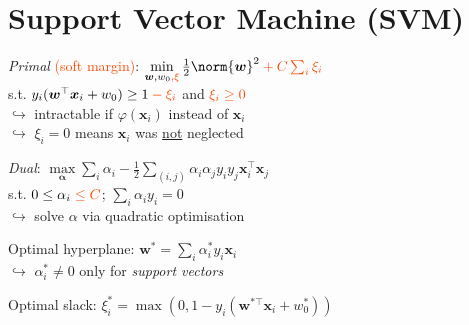 \section{Support Vector Machine (SVM)}

\textit{Primal} \textcolor{OrangeRed}{(soft margin)}: \: $\min\limits_{\bm w, w_0 \color{OrangeRed}, \xi} \frac12 \norm{\bm w}^2 \color{OrangeRed} + C\sum_i \xi_i$\\
\qquad s.t. \: $y_i(\bm w^\top \bm x_i + w_0) \geq 1 \color{OrangeRed} - \xi_i$ \: and \: $\color{OrangeRed} \xi_i \geq 0$\\
\quad $\hookrightarrow$ intractable if $\varphi(\bm x_i)$ instead of $\bm x_i$\\
\quad $\hookrightarrow$ $\xi_i = 0$ means $\bm x_i$ was \underline{not} neglected

\textit{Dual}: \: $\max\limits_{\bm\alpha} \sum_i \alpha_i - \frac12 \sum_{(i,j)} \alpha_i \alpha_j y_i y_j \bm x_i^\top \bm x_j$\\
\qquad\qquad s.t. \: $0 \leq \alpha_i \color{OrangeRed} \leq C$; \: $\sum_i \alpha_i y_i = 0$\\
\quad $\hookrightarrow$ solve $\alpha$ via quadratic optimisation

Optimal hyperplane: \: $\bm w^\ast = \sum_i \alpha_i^\ast y_i \bm x_i$\\
\quad $\hookrightarrow$ $\alpha_i^\ast \neq 0$ only for \textit{support vectors}

Optimal slack: \: $\xi_i^\ast = \max(0, 1 - y_i(\bm w^{\ast\top} \!\bm x_i {+} w_0^\ast))$

